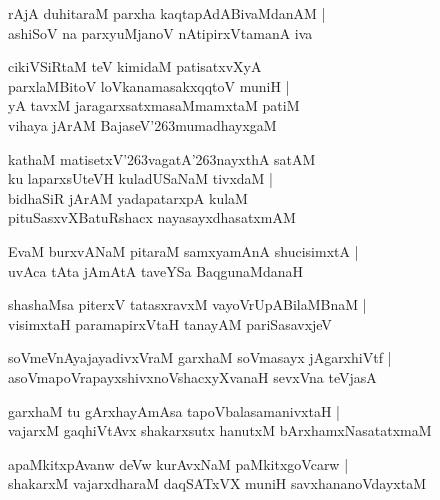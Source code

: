 \documentclass[twoside,12pt,openright]{book}
\def\S{\char'263}
\newcounter{shloka}[chapter]
\begin{document}
\begin{shloka}%
rAjA duhitaraM parxha kaqtapAdABivaMdanAM |\\
ashiSoV na parxyuMjanoV nAtipirxVtamanA iva 
\end{shloka}

\begin{shloka}%
cikiVSiRtaM teV kimidaM patisatxvXyA \\
parxlaMBitoV loVkanamasakxqqtoV muniH |\\
yA tavxM jaragarxsatxmasaMmamxtaM patiM \\
vihaya jArAM BajaseV\S mumadhayxgaM 
\end{shloka}

\begin{shloka}%
kathaM matisetxV\S vagatA\S nayxthA satAM \\
ku laparxsUteVH kuladUSaNaM tivxdaM |\\
bidhaSiR jArAM yadapatarxpA kulaM \\
pituSasxvXBatuRshacx nayasayxdhasatxmAM 
\end{shloka}

\begin{shloka}%
EvaM burxvANaM pitaraM samxyamAnA shucisimxtA |\\
uvAca tAta jAmAtA taveYSa BaqgunaMdanaH 
\end{shloka}

\begin{shloka}%
shashaMsa piterxV tatasxravxM vayoVrUpABilaMBnaM |\\
visimxtaH paramapirxVtaH tanayAM pariSasavxjeV 
\end{shloka}

\begin{shloka}%
soVmeVnAyajayadivxVraM garxhaM soVmasayx jAgarxhiVtf |\\
asoVmapoVrapayxshivxnoVshacxyXvanaH sevxVna teVjasA 
\end{shloka}

\begin{shloka}%
garxhaM tu gArxhayAmAsa tapoVbalasamanivxtaH |\\
vajarxM gaqhiVtAvx shakarxsutx hanutxM bArxhamxNasatatxmaM 
\end{shloka}

\begin{shloka}%
apaMkitxpAvanw deVw kurAvxNaM paMkitxgoVcarw |\\
shakarxM vajarxdharaM daqSATxVX muniH savxhananoVdayxtaM 
\end{shloka}
\end{document}
